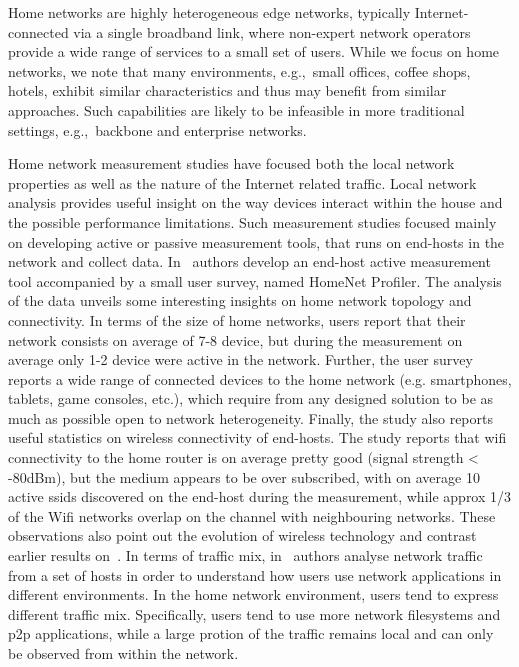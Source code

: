 Home networks are highly heterogeneous edge networks, typically
Internet-connected via a single broadband link, where non-expert network
operators provide a wide range of services to a small set of users.  While we
focus on home networks, we note that many environments, e.g.,~small offices,
coffee shops, hotels, exhibit similar characteristics and thus may benefit from
similar approaches. Such capabilities are likely to be infeasible in more
traditional settings, e.g.,~backbone and enterprise networks. 

Home network measurement studies have focused both the local network properties
as well as the nature of the Internet related traffic. Local network analysis
provides useful insight on the way devices interact within the house and the
possible performance limitations. Such measurement studies focused mainly on
developing active or passive measurement tools, that runs on end-hosts in the
network and collect data. In~\cite{homenetProfiler} authors develop an end-host
active  measurement tool accompanied by a small user survey, named HomeNet
Profiler. The analysis of the data unveils some interesting insights on home
network topology and connectivity. In terms of the size of home networks, users
report that their network consists on average of 7-8 device, but during the
measurement on average only 1-2 device were active in the network. Further, the
user survey reports a wide range of connected devices to the home network (e.g.
smartphones, tablets, game consoles, etc.), which require from any designed
solution to be as much as possible open to network heterogeneity. Finally, the
study also reports useful statistics on wireless connectivity of end-hosts.  The
study reports that wifi connectivity to the home router is on average pretty
good (signal strength < -80dBm), but the medium appears to be over subscribed,
with on average 10 active ssids discovered on the end-host during the
measurement, while approx 1/3 of the Wifi networks overlap on the channel with
neighbouring networks. These observations also point out the evolution of
wireless technology and contrast earlier results
on~\cite{Yarvis05characterizationof}. In terms of traffic mix,
in~\cite{Reggani12} authors analyse network traffic from a set of hosts in order
to understand how users use network applications in different environments. In
the home network environment, users tend to express different traffic mix.
Specifically, users tend to use more network filesystems and p2p applications,
while a large protion of the traffic remains local and can only be observed from
within the network. 

